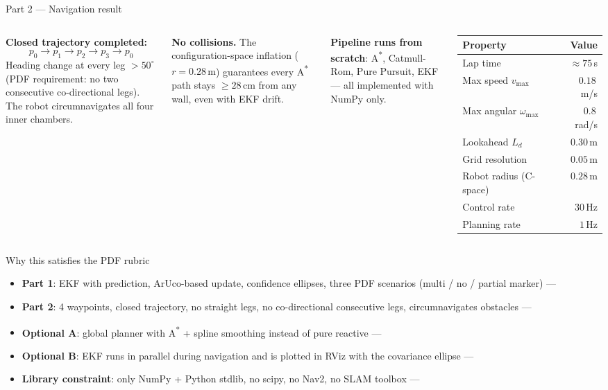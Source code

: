 \documentclass[10pt,aspectratio=169]{beamer}
\begin{document}
\begin{frame}{Part 2 — Navigation result}
  \begin{columns}[T,onlytextwidth]
    \textbf{Closed trajectory completed:}
    \[
      p_0 \to p_1 \to p_2 \to p_3 \to p_0
    \]
    Heading change at every leg $> 50^\circ$ (PDF requirement: no two
    consecutive co-directional legs). The robot circumnavigates all four
    inner chambers.

    \medskip
    \textbf{No collisions.} The configuration-space inflation
    ($r = 0.28\,\text{m}$) guarantees every A\textsuperscript{*} path stays
    $\geq 28\,$cm from any wall, even with EKF drift.

    \medskip
    \textbf{Pipeline runs from scratch}: A\textsuperscript{*}, Catmull-Rom,
    Pure Pursuit, EKF — all implemented with NumPy only.

    \centering
    \scriptsize
    \begin{tabular}{lr}
      \toprule
      Property & Value \\
      \midrule
      Lap time & $\approx 75$\,s \\
      Max speed $v_{\max}$ & $0.18$\,m/s \\
      Max angular $\omega_{\max}$ & $0.8$\,rad/s \\
      Lookahead $L_d$ & $0.30$\,m \\
      Grid resolution & $0.05$\,m \\
      Robot radius (C-space) & $0.28$\,m \\
      Control rate & $30$\,Hz \\
      Planning rate & $1$\,Hz \\
      \bottomrule
    \end{tabular}
  \end{columns}
\end{frame}

\begin{frame}{Why this satisfies the PDF rubric}
  \begin{itemize}
    \item \textbf{Part 1}: EKF with prediction, ArUco-based update,
          confidence ellipses, three PDF scenarios (multi / no / partial marker)
          — \checkmark
    \item \textbf{Part 2}: 4 waypoints, closed trajectory, no straight legs,
          no co-directional consecutive legs, circumnavigates obstacles
          — \checkmark
    \item \textbf{Optional A}: global planner with A\textsuperscript{*}
          + spline smoothing instead of pure reactive — \checkmark
    \item \textbf{Optional B}: EKF runs in parallel during navigation
          and is plotted in RViz with the covariance ellipse — \checkmark
    \item \textbf{Library constraint}: only NumPy + Python stdlib, no scipy,
          no Nav2, no SLAM toolbox — \checkmark
  \end{itemize}
\end{frame}
\end{document}
